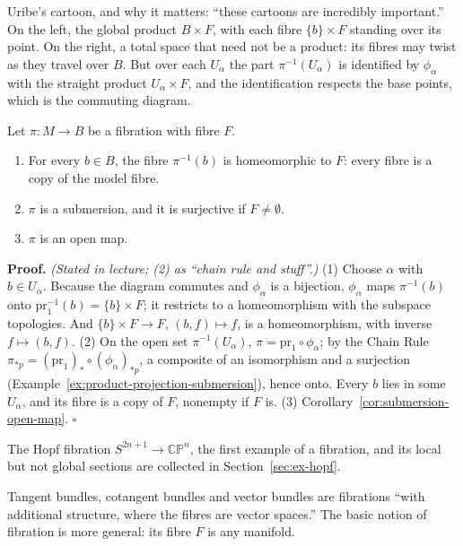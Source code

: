 \documentclass[11pt]{report}
\makeatletter
\newcounter{thmcounter}[section]
\renewenvironment{proof}[1][Proof]{\noindent\textbf{#1.} }{\hfill$\square$\par\vspace{5pt}}
\newcommand{\thmlabel}[1]{\edef\@currentlabel{\arabic{section}.\arabic{thmcounter}}\label{#1}}
\makeatother
\begin{document}
Uribe's cartoon, and why it matters: ``these cartoons are incredibly important.'' On the left, the global product $B \times F$, with each fibre $\{b\} \times F$ standing over its point. On the right, a total space that need not be a product: its fibres may twist as they travel over $B$. But over each $U_\alpha$ the part $\pi^{-1}(U_\alpha)$ is identified by $\phi_\alpha$ with the straight product $U_\alpha \times F$, and the identification respects the base points, which is the commuting diagram.

\begin{propbox}\thmlabel{prop:fibration-properties}
Let $\pi : M \to B$ be a fibration with fibre $F$.
\begin{enumerate}
    \item For every $b \in B$, the fibre $\pi^{-1}(b)$ is homeomorphic to $F$: every fibre is a copy of the model fibre.
    \item $\pi$ is a submersion, and it is surjective if $F \ne \emptyset$.
    \item $\pi$ is an open map.
\end{enumerate}
\end{propbox}

\begin{proof}
\textit{(Stated in lecture; (2) as ``chain rule and stuff''.)} (1) Choose $\alpha$ with $b \in U_\alpha$. Because the diagram commutes and $\phi_\alpha$ is a bijection, $\phi_\alpha$ maps $\pi^{-1}(b)$ onto $\mathrm{pr}_1^{-1}(b) = \{b\} \times F$; it restricts to a homeomorphism with the subspace topologies. And $\{b\} \times F \to F$, $(b, f) \mapsto f$, is a homeomorphism, with inverse $f \mapsto (b, f)$. (2) On the open set $\pi^{-1}(U_\alpha)$, $\pi = \mathrm{pr}_1 \circ \phi_\alpha$; by the Chain Rule $\pi_{*p} = (\mathrm{pr}_1)_{*} \circ (\phi_\alpha)_{*p}$, a composite of an isomorphism and a surjection (Example~\ref{ex:product-projection-submersion}), hence onto. Every $b$ lies in some $U_\alpha$, and its fibre is a copy of $F$, nonempty if $F$ is. (3) Corollary~\ref{cor:submersion-open-map}.
\end{proof}

The Hopf fibration $S^{2n+1} \to \mathbb{CP}^n$, the first example of a fibration, and its local but not global sections are collected in Section~\ref{sec:ex-hopf}.

\begin{rembox}\label{rem:what-comes-next}
Tangent bundles, cotangent bundles and vector bundles are fibrations ``with additional structure, where the fibres are vector spaces.'' The basic notion of fibration is more general: its fibre $F$ is any manifold.
\end{rembox}
\end{document}
